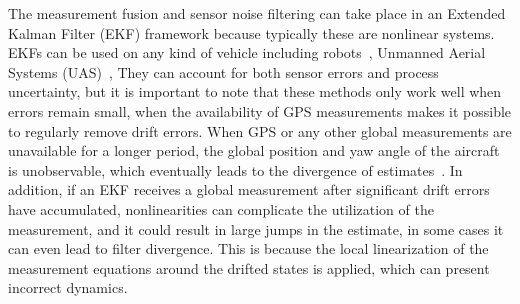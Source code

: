 The measurement fusion and sensor noise filtering can take place in an Extended Kalman Filter (EKF) framework because typically these are nonlinear systems. EKFs can be used on any kind of vehicle including robots~\cite{EKF-Robot}, Unmanned Aerial Systems (UAS)~\cite{EKF-UAS-1, EKF-UAS-2}, \etc{} They can account for both sensor errors and process uncertainty, but it is important to note that these methods only work well when errors remain small, \eg{} when the availability of GPS measurements makes it possible to regularly remove drift errors. When GPS or any other global measurements are unavailable for a longer period, the global position and yaw angle of the aircraft is unobservable, which eventually leads to the divergence of estimates~\cite{unobservable-1, unobservable-2}. In addition, if an EKF receives a global measurement after significant drift errors have accumulated, nonlinearities can complicate the utilization of the measurement, and it could result in large jumps in the estimate, in some cases it can even lead to filter divergence. This is because the local linearization of the measurement equations around the drifted states is applied, which can present incorrect dynamics.

